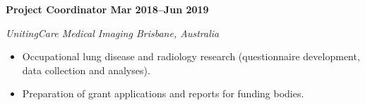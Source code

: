 \textbf{Project Coordinator \hfill Mar 2018--Jun 2019}\par
\textit{UnitingCare Medical Imaging \hfill Brisbane, Australia}\par
\begin{itemize}
    \item Occupational lung disease and radiology research (questionnaire development, data collection and analyses).
    \item Preparation of grant applications and reports for funding bodies.
\end{itemize}\par